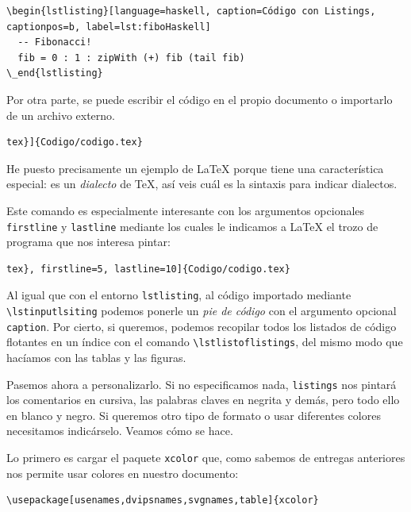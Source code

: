 \begin{lstlisting}[language={[latex]tex}]
% Código con pie en la parte inferior (por defecto en la superior) y etiqueta
\begin{lstlisting}[language=haskell, caption=Código con Listings, captionpos=b, label=lst:fiboHaskell]
  -- Fibonacci!
  fib = 0 : 1 : zipWith (+) fib (tail fib)
\_end{lstlisting}
\end{lstlisting}

Por otra parte, se puede escribir el código en el propio documento o
importarlo de un archivo externo.

\begin{lstlisting}[language={[latex]tex}]
tex}]{Codigo/codigo.tex}
\end{lstlisting}

He puesto precisamente un ejemplo de LaTeX porque tiene una
característica especial: es un \emph{dialecto} de TeX, así veis cuál es
la sintaxis para indicar dialectos.

Este comando es especialmente interesante con los argumentos opcionales
\lstinline!firstline! y \lstinline!lastline! mediante los cuales le
indicamos a LaTeX el trozo de programa que nos interesa pintar:

\begin{lstlisting}[language={[latex]tex}]
tex}, firstline=5, lastline=10]{Codigo/codigo.tex}
\end{lstlisting}

Al igual que con el entorno \lstinline!lstlisting!, al código importado
mediante \lstinline!\lstinputlsiting! podemos ponerle un \emph{pie de
código} con el argumento opcional \lstinline!caption!. Por cierto, si
queremos, podemos recopilar todos los listados de código flotantes en un
índice con el comando \lstinline!\lstlistoflistings!, del mismo modo que
hacíamos con las tablas y las figuras.

Pasemos ahora a personalizarlo. Si no especificamos nada,
\lstinline!listings! nos pintará los comentarios en cursiva, las
palabras claves en negrita y demás, pero todo ello en blanco y negro. Si
queremos otro tipo de formato o usar diferentes colores necesitamos
indicárselo. Veamos cómo se hace.

Lo primero es cargar el paquete \lstinline!xcolor! que, como sabemos de
entregas anteriores nos permite usar colores en nuestro documento:

\begin{lstlisting}[language={[latex]tex}]
\usepackage[usenames,dvipsnames,svgnames,table]{xcolor}
\end{lstlisting}

